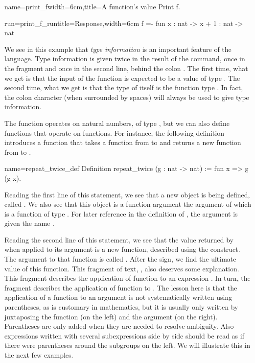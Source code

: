 \begin{coq}{name=print_f}{width=6cm,title=A function's value}
Print f.
\end{coq}
\begin{coqout}{run=print_f_run}{title=Response,width=6cm}
f =- fun x : nat -> x + 1
       : nat -> nat
\end{coqout}

We see in this example that {\em type information} is an important
feature of the language.  Type information is given twice in the
result of the  command, once in the fragment  and once in the second line, behind the colon \C{:}.  The first
time, what we get is that the input of the function is expected to be
a value of type .  The second time, what we get is that the
type of  itself is the function type .  In fact,
the colon character (when surrounded by spaces) will always be used to
give type information.

The function  operates on natural numbers, of type , but
we can also define functions that operate on functions.  For instance,
the following definition introduces a function that takes a function
from  to  and returns a new function from  to
.

\begin{coq}{name=repeat_twice_def}{}
Definition repeat_twice (g : nat -> nat) :=
  fun x => g (g x).
\end{coq}
Reading the first line of this statement, we see that a new object is
being defined, called .  We also see that this object
is a function argument the argument of which is a function of
type .  For later reference in the definition of
, the argument is given the name .

Reading the second line of this statement, we see that the value
returned by  when applied to its argument is a new
function, described using the  construct.  The
argument to that function is called .  After the \C{=>} sign, we
find the ultimate value of this function.  This fragment of text, , also deserves some explanation.  This fragment describes the
application of function  to an expression .  In turn,
the fragment  describes the application of function  to
.  The lesson here is that the application of a function to an
argument is not systematically written using parentheses, as is
customary in mathematics, but it is usually only written by
juxtaposing the function (on the left) and the argument (on the
right).  Parentheses are only added when they are needed to resolve
ambiguity.  Also expressions written with several subexpressions side
by side should be read as if there were parentheses around the
subgroups on the left.  We will illustrate this in the next few
examples.

